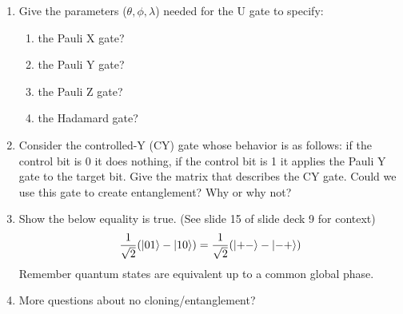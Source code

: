\documentclass[12pt]{article}
\begin{document}
\begin{enumerate}[font=\bfseries]
    \item Give the parameters ($\theta,\phi,\lambda$) needed for the U gate to specify:
        \begin{enumerate}
            \item the Pauli X gate?
            \item the Pauli Y gate?
            \item the Pauli Z gate?
            \item the Hadamard gate?
        \end{enumerate}
    \item Consider the controlled-Y (CY) gate whose behavior is as follows: if the control bit is 0 it does nothing, if the control bit is 1 it applies the Pauli Y gate to the target bit. Give the matrix that describes the CY gate. Could we use this gate to create entanglement? Why or why not?
    \item Show the below equality is true. (See slide 15 of slide deck 9 for context)
    \[\frac{1}{\sqrt{2}}(\ket{01} - \ket{10}) = \frac{1}{\sqrt{2}}(\ket{+-} - \ket{-+})\]
    Remember quantum states are equivalent up to a common global phase.
    \item More questions about no cloning/entanglement?
\end{enumerate}
\end{document}
